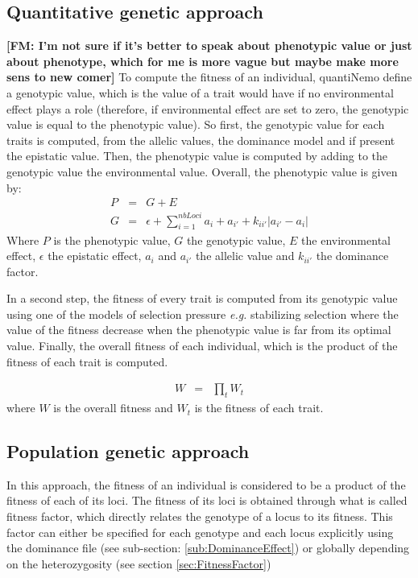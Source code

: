 \documentclass[letterpaper,12pt,oneside]{book}
\newcommand{\fm}[1]{\small {\bf \color{blue} [FM:  #1]} \normalsize}
\begin{document}
\subsection{Quantitative genetic approach}
\fm{I'm not sure if it's better to speak about phenotypic value or just about phenotype, which for me is more vague but maybe make more sens to new comer}
To compute the fitness of an individual, quantiNemo define a genotypic value, which is the value of a trait would have if no environmental effect plays a role (therefore, if environmental effect are set to zero, the genotypic value is equal to the phenotypic value). So first, the genotypic value for each traits is computed, from the allelic values, the dominance model and if present the epistatic value. Then, the phenotypic value is computed by adding to the genotypic value the environmental value. Overall, the phenotypic value is given by:
\begin{eqnarray}
P &=& G + E \\
G&=&\epsilon+\sum_{i=1}^{nbLoci}a_i+a_{i'}+k_{ii'}|a_{i'}-a_i| 
\end{eqnarray}
Where $P$ is the phenotypic value, $G$ the genotypic value, $E$ the environmental effect, $\epsilon$ the epistatic effect, $a_i$ and $a_{i'}$ the allelic value and $k_{ii'}$ the dominance factor. 

In a second step, the fitness of every trait is computed from its genotypic value using one of the models of selection pressure \textit{e.g.} stabilizing selection where the value of the fitness decrease when the phenotypic value is far from its optimal value. Finally, the overall fitness of each individual, which is the product of the fitness of each trait is computed.

\begin{eqnarray}
W &=& \prod_t W_t
\end{eqnarray}
where $W$ is the overall fitness and $W_t$ is the fitness of each trait. 
\subsection{Population genetic approach}
In this approach, the fitness of an individual is considered to be a product of the fitness of each of its loci. The fitness of its loci is obtained through what is called fitness factor, which directly relates the genotype of a locus to its fitness. This factor can either be specified for each genotype and each locus explicitly using the dominance file (see sub-section: \ref{sub:DominanceEffect}) or globally depending on the heterozygosity (see section \ref{sec:FitnessFactor})
\end{document}
